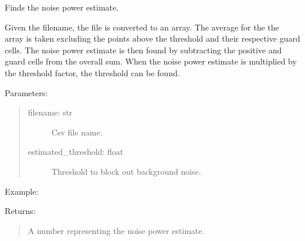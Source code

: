 \documentclass[letterpaper,10pt,english]{sphinxmanual}
\begin{document}
\begin{fulllineitems}
\label{\detokenize{X4 radar:X4_threshold.noise_power_estimate}}
Finds the noise power estimate.

Given the filename, the file is converted to an array. The average for the the array is taken excluding the points above the threshold and their respective guard cells.
The noise power estimate is then found by subtracting the positive and guard cells from the overall sum. When the noise power estimate is multiplied by the threshold factor, the threshold can be found.

Parameters:
\begin{quote}
\begin{description}
\item[{filename: str}] \leavevmode
Csv file name.

\item[{estimated\_threshold: float}] \leavevmode
Threshold to block out background noise.

\end{description}
\end{quote}

Example:

\begin{sphinxVerbatim}[commandchars=\\\{\}]
\end{sphinxVerbatim}

Returns:
\begin{quote}

A number representing the noise power estimate.
\end{quote}

\end{fulllineitems}

\end{document}
